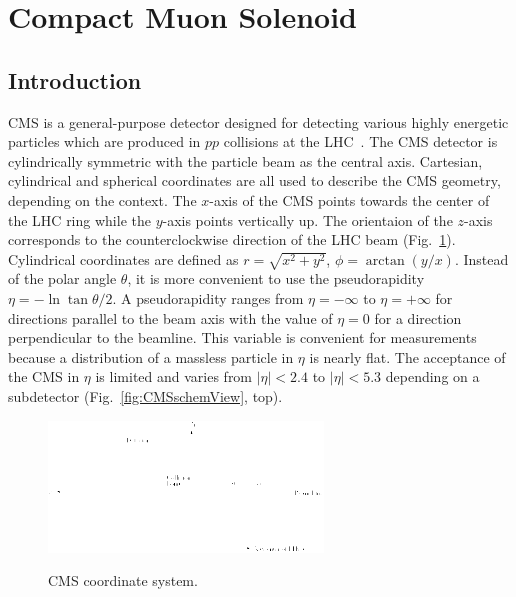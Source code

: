 \section{Compact Muon Solenoid}
\label{sec:Exp_CMS}
\subsection{Introduction}



CMS is a general-purpose detector designed for detecting various highly energetic particles which are produced in $pp$ collisions at the LHC~\cite{ref_CMS_TDR}. The CMS detector is cylindrically symmetric with the particle beam as the central axis. Cartesian, cylindrical and spherical coordinates are all used to describe the CMS geometry, depending on the context. The $x$-axis of the CMS points towards the center of the LHC ring while the $y$-axis points vertically up. The orientaion of the $z$-axis corresponds to the counterclockwise direction of the LHC beam (Fig.~\ref{fig:CMScoord}). Cylindrical coordinates are defined as $r=\sqrt{x^2+y^2}$, $\phi=\arctan(y/x)$. Instead of the polar angle $\theta$, it is more convenient to use the pseudorapidity $\eta=-\ln{\tan{\theta/2}}$. A pseudorapidity ranges from $\eta=-\infty$ to $\eta=+\infty$ for directions parallel to the beam axis with the value of $\eta=0$ for a direction perpendicular to the beamline. This variable is convenient for measurements because a distribution of a massless particle in $\eta$ is nearly flat. The acceptance of the CMS in $\eta$ is limited and varies from $|\eta|<2.4$ to $|\eta|<5.3$ depending on a subdetector (Fig.~\ref{fig:CMSschemView}, top).   

\begin{figure}[htb]
  \begin{center}
    {\includegraphics[width=0.65\textwidth]{../figs/Exp/CMScoord.png}}
    \caption{CMS coordinate system. }
    \label{fig:CMScoord}
  \end{center}
\end{figure}

